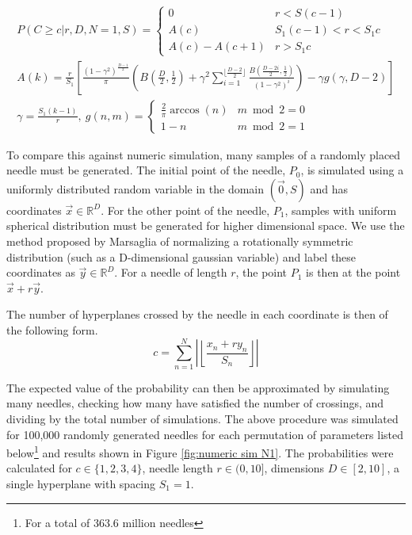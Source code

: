 \documentclass{article}
\begin{document}
\begin{gather*}
	P(C\ge c | r, D, N=1, S) = \begin{cases}
		0 & r < S(c-1) \\ 
		A(c)  & S_1 (c-1) < r < S_1 c \\
		A(c) - A(c+1) & r > S_1c		
	\end{cases} \\
	A(k) = \frac{r}{S_1} \left[\frac{(1-\gamma^2)^{\frac{D-1}{2}}}{\pi} \left(B\left(\frac{D}{2}, \frac{1}{2} \right) + \gamma^2 \sum_{i=1}^{\lfloor \frac{D-2}{2} \rfloor}\frac{B(\frac{D-2i}{2}, \frac{1}{2})}{(1-\gamma^2)^i}\right) - \gamma g(\gamma, D-2) \right] \\
	\gamma = \frac{S_1(k-1)}{r},\ g(n, m) = \begin{cases}
		\frac{2}{\pi}\arccos(n) & m\bmod 2 = 0 \\
		1-n & m \bmod 2 = 1
	\end{cases}
\end{gather*}

To compare this against numeric simulation, many samples of a randomly placed needle must be generated.
The initial point of the needle, $P_0$, is simulated using a uniformly distributed random variable in 
the domain $(\vec 0, S)$ and has coordinates $\vec x \in \mathbb{R}^D$. For the other point of the needle, $P_1$, samples 
with uniform spherical distribution must be generated for higher dimensional space. We use the method
proposed by Marsaglia  of normalizing a rotationally symmetric distribution 
(such as a D-dimensional gaussian variable) and label these coordinates as $\vec y \in \mathbb{R}^D$. For a needle of
length $r$, the point $P_1$ is then at the point $\vec x + r \vec y$.

The number of hyperplanes crossed by the needle in each coordinate is then of the following form.
\begin{equation}
	c = \sum_{n=1}^{N} \left|\left\lfloor \frac{x_n+r y_n}{S_n} \right\rfloor\right|
\end{equation}

The expected value of the probability can then be approximated by simulating many needles, checking
how many have satisfied the number of crossings, and dividing by the total number of simulations.
The above procedure was simulated for 100,000 randomly generated needles for each permutation of parameters
listed below\footnote{For a total of 363.6 million needles} and results shown in Figure \ref{fig:numeric sim N1}. The probabilities were calculated for
$c\in\{1,2,3,4\}$, needle length $r\in(0, 10]$, dimensions $D\in[2, 10]$, a single hyperplane with
spacing $S_1=1$.
\end{document}
